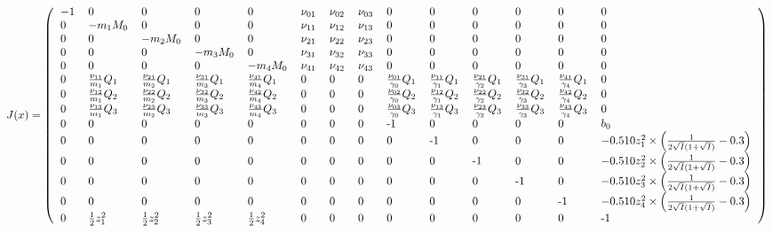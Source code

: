 \documentclass[onecolumn]{article}
\begin{document}
\begin{landscape}
\[
J(x) = \left(
\begin{tabular}{llllllllllllll}
$-1$ & 0 & 0 & 0 & 0 &
$\nu_{01}$ & $\nu_{02}$ & $\nu_{03}$ &
0 & 0 & 0 & 0 & 0 &
0\\
0 & $-m_1 M_0$ & 0 & 0 & 0 &
$\nu_{11}$ & $\nu_{12}$ & $\nu_{13}$ &
0 & 0 & 0 & 0 & 0 &
0\\
0 & 0 & $-m_2 M_0$  & 0 & 0 &
$\nu_{21}$ & $\nu_{22}$ & $\nu_{23}$ &
0 & 0 & 0 & 0 & 0 &
0\\
0 & 0 & 0 & $-m_3 M_0$ & 0 &
$\nu_{31}$ & $\nu_{32}$ & $\nu_{33}$ &
0 & 0 & 0 & 0 & 0 &
0\\
0 & 0 & 0 & 0 & $-m_4 M_0$ &
$\nu_{41}$ & $\nu_{42}$ & $\nu_{43}$ &
0 & 0 & 0 & 0 & 0 &
0\\
0 &
$\frac{\nu_{11}}{m_1}Q_1$ & $\frac{\nu_{21}}{m_2}Q_1$ &
$\frac{\nu_{31}}{m_3}Q_1$ & $\frac{\nu_{41}}{m_4}Q_1$ &
0 & 0 & 0 &
$\frac{\nu_{01}}{\gamma_0}Q_1$ & $\frac{\nu_{11}}{\gamma_1}Q_1$ &
$\frac{\nu_{21}}{\gamma_2}Q_1$ & $\frac{\nu_{31}}{\gamma_3}Q_1$ &
$\frac{\nu_{41}}{\gamma_4}Q_1$ &
0\\
0 &
$\frac{\nu_{12}}{m_1}Q_2$ & $\frac{\nu_{22}}{m_2}Q_2$ &
$\frac{\nu_{32}}{m_3}Q_2$ & $\frac{\nu_{42}}{m_4}Q_2$ &
0 & 0 & 0 &
$\frac{\nu_{02}}{\gamma_0}Q_2$ & $\frac{\nu_{12}}{\gamma_1}Q_2$ &
$\frac{\nu_{22}}{\gamma_2}Q_2$ & $\frac{\nu_{32}}{\gamma_3}Q_2$ &
$\frac{\nu_{42}}{\gamma_4}Q_2$ &
0\\
0 &
$\frac{\nu_{13}}{m_1}Q_3$ & $\frac{\nu_{23}}{m_2}Q_3$ &
$\frac{\nu_{33}}{m_3}Q_3$ & $\frac{\nu_{43}}{m_4}Q_3$ &
0 & 0 & 0 &
$\frac{\nu_{03}}{\gamma_0}Q_3$ & $\frac{\nu_{13}}{\gamma_1}Q_3$ &
$\frac{\nu_{23}}{\gamma_2}Q_3$ & $\frac{\nu_{33}}{\gamma_3}Q_3$ &
$\frac{\nu_{43}}{\gamma_4}Q_3$ &
0\\
0 & 0 & 0 & 0 & 0 &
0 & 0 & 0 &
-1 & 0 & 0 & 0 & 0 &
$b_0$\\
0 & 0 & 0 & 0 & 0 &
0 & 0 & 0 &
0 & -1 & 0 & 0 & 0 &
$-0.510 z_1^2\times\left(\frac{1}{2\sqrt{I}(1+\sqrt{I})} -0.3\right)$\\
0 & 0 & 0 & 0 & 0 &
0 & 0 & 0 &
0 & 0 & -1 & 0 & 0 &
$-0.510 z_2^2\times\left(\frac{1}{2\sqrt{I}(1+\sqrt{I})} -0.3\right)$\\
0 & 0 & 0 & 0 & 0 &
0 & 0 & 0 &
0 & 0 & 0 & -1 & 0 &
$-0.510 z_3^2\times\left(\frac{1}{2\sqrt{I}(1+\sqrt{I})} -0.3\right)$\\
0 & 0 & 0 & 0 & 0 &
0 & 0 & 0 &
0 & 0 & 0 & 0 & -1 &
$-0.510 z_4^2\times\left(\frac{1}{2\sqrt{I}(1+\sqrt{I})} -0.3\right)$\\
0 &
$\frac{1}{2}z_1^2$ & $\frac{1}{2}z_2^2$ &
$\frac{1}{2}z_3^2$ & $\frac{1}{2}z_4^2$ &
0 & 0 & 0 &
0 & 0 & 0 & 0 & 0 &
-1\\
\end{tabular}
\right)
\]
\end{landscape}
\end{document}
